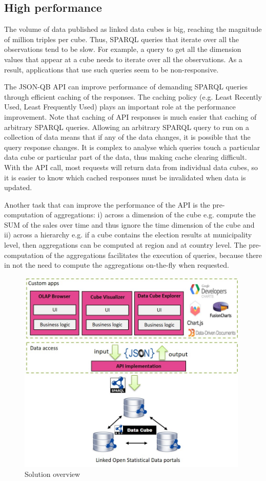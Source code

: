 \documentclass{llncs}
\begin{document}
\subsection{High performance}

The volume of data published as linked data cubes is big, reaching the magnitude of million triples per cube. Thus, SPARQL queries that iterate over all the observations tend to be slow. For example, a query to get all the dimension values that appear at a cube needs to iterate over all the observations. As a result, applications that use such queries seem to be non-responsive. 

The JSON-QB API can improve performance of demanding SPARQL queries through efficient caching of the responses. The caching policy (e.g. Least Recently Used, Least Frequently Used) plays an important role at the performance improvement. Note that caching of API responses is much easier that caching of arbitrary SPARQL queries. Allowing an arbitrary SPARQL query to run on a collection of data means that if any of the data changes, it is possible that the query response changes.  It is complex to analyse which queries touch a particular data cube or particular part of the data, thus making cache clearing difficult.  With the API call, most requests will return data from individual data cubes, so it is easier to know which cached responses must be invalidated when data is updated.

Another task that can improve the performance of the API is the pre-computation of aggregations: i) across a dimension of the cube e.g. compute the SUM of the sales over time and thus ignore the time dimension of the cube and ii) across a hierarchy e.g. if a cube contains the election results at municipality level, then aggregations can be computed at region and at country level. The pre-computation of the aggregations facilitates the execution of queries, because there in not the need to compute the aggregations on-the-fly when requested. 

\begin{figure}[h!]
  \includegraphics[width=110mm]{images/overview.jpg}
\caption{Solution overview}
\label{fig:overview}
\end{figure}
\end{document}
